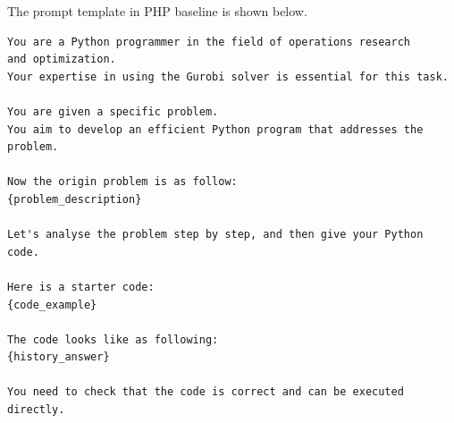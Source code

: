 The prompt template in PHP baseline is shown below.
\begin{lstlisting}[style=promptstyle]
You are a Python programmer in the field of operations research
and optimization.
Your expertise in using the Gurobi solver is essential for this task.

You are given a specific problem.
You aim to develop an efficient Python program that addresses the problem.

Now the origin problem is as follow:
{problem_description}

Let's analyse the problem step by step, and then give your Python code.

Here is a starter code:
{code_example}

The code looks like as following:
{history_answer}

You need to check that the code is correct and can be executed directly.
\end{lstlisting}
